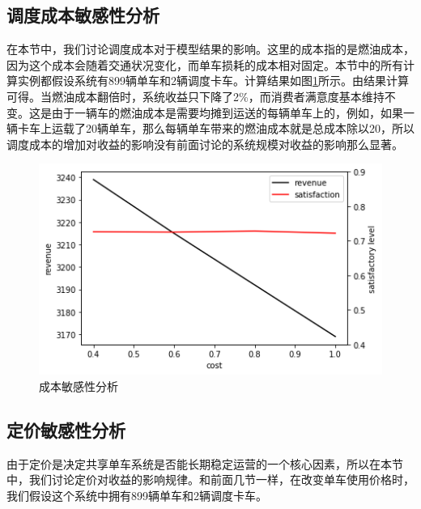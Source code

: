 \documentclass[]{tongjithesis}
\numberwithin{equation}{chapter}
\begin{document}
\subsection{调度成本敏感性分析}
在本节中，我们讨论调度成本对于模型结果的影响。这里的成本指的是燃油成本，因为这个成本会随着交通状况变化，而单车损耗的成本相对固定。本节中的所有计算实例都假设系统有899辆单车和2辆调度卡车。计算结果如图\ref{sens_cost}所示。由结果计算可得。当燃油成本翻倍时，系统收益只下降了2\%，而消费者满意度基本维持不变。这是由于一辆车的燃油成本是需要均摊到运送的每辆单车上的，例如，如果一辆卡车上运载了20辆单车，那么每辆单车带来的燃油成本就是总成本除以20，所以调度成本的增加对收益的影响没有前面讨论的系统规模对收益的影响那么显著。
\begin{figure}[H]
    \centering
    \includegraphics[width=0.7 \textwidth]{figures_main/sensitivity_cost.png}
    \caption{成本敏感性分析}
    \label{sens_cost}
\end{figure}

\subsection{定价敏感性分析}
由于定价是决定共享单车系统是否能长期稳定运营的一个核心因素，所以在本节中，我们讨论定价对收益的影响规律。和前面几节一样，在改变单车使用价格时，我们假设这个系统中拥有899辆单车和2辆调度卡车。
\end{document}
